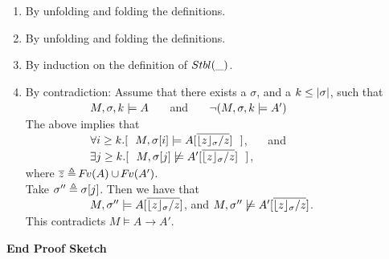 \begin{enumerate}
\item
By unfolding and folding the definitions.
\item
By unfolding and folding the definitions.
\item
By induction on the definition of ${Stbl( \_ )}$.
\item
  By contradiction: Assume that there exists a $\sigma$,  and a  $k\leq |\sigma|$,    such that  \\
$\strut \hspace{2cm}   M,\sigma ,{k} \models {A} $ \ \ \ and \ \ \ $\neg (M,\sigma ,{k} \models {A} ')$\\
 The  above implies that \\
$\strut \hspace{2cm} \forall i\geq k.[\ \ M,{\RestictTo {\sigma}{i}} \models A[\overline{ {{\interpret \sigma z}/ z}}]\ \ ]$, \ \ \ and\\
$\strut \hspace{2cm} \exists j\geq k.[\ \  M,{\RestictTo {\sigma}{j}} \not\models A'[ \overline{ {{\interpret \sigma z}/ z}}]\ \ ]$,\\
 where  $\overline z \triangleq {\hspace{-1pt}F\hspace{-1pt}}v(A)\cup {\hspace{-1pt}F\hspace{-1pt}}v(A')$.\\
 Take $\sigma''\triangleq  \sigma[j]$. Then we have that\\
$\strut \hspace{2cm} M, \sigma'' \models A[\overline{ {{\lfloor z \rfloor_{\sigma}}/ z}}]$,  and  $M,  \sigma'' \not\models A'[\overline{ {{\lfloor z \rfloor_{\sigma}}/ z}}]$.\\
 This contradicts $ M  \models A \rightarrow A'$.\\
 {}
 {}
\end{enumerate}
\noindent
{\textbf{End Proof Sketch}} 


